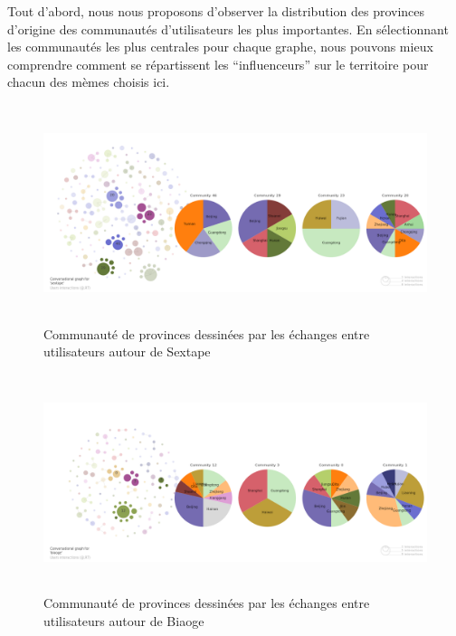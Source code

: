 Tout d{\textquoteright}abord, nous nous proposons
d{\textquoteright}observer la distribution des provinces
d{\textquoteright}origine des communaut\'es
d{\textquoteright}utilisateurs les plus importantes. En s\'electionnant
les communaut\'es les plus centrales pour chaque graphe, nous pouvons
mieux comprendre comment se r\'epartissent les
{\textquotedblleft}influenceurs{\textquotedblright} sur le territoire
pour chacun des m\`emes choisis ici.

\begin{figure}[H]
    \centering
    \includegraphics[width=5.9996in,height=2.5004in]{figures/chap4/chapitre4-img54.png}
    \caption{
        Communaut\'e de provinces dessin\'ees par les \'echanges entre utilisateurs autour de Sextape
    }
    \label{fig:sextape-users-pie}
\end{figure}

\begin{figure}[H]
    \centering     
    \includegraphics[width=5.9996in,height=2.5004in]{figures/chap4/chapitre4-img55.png}
    \caption{
        Communaut\'e de provinces dessin\'ees par les \'echanges entre utilisateurs autour de Biaoge
    }
    \label{fig:biaoge-users-pie}
\end{figure}

 

